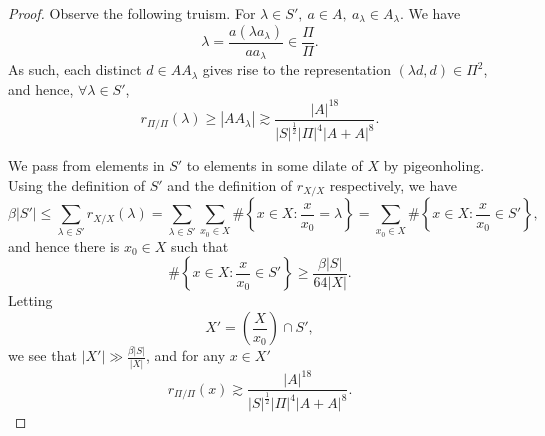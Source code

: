 \documentclass[reqno]{amsart}
\numberwithin{equation}{section}
\begin{document}
\begin{proof}
Observe the following truism. For \(\lambda \in S',~ a \in A,~ a_{\lambda} \in A_{\lambda} \). We have
\[
    \lambda = \frac{a \left( \lambda a_{\lambda}  \right) }{a a_{\lambda} } \in \frac{\Pi}{\Pi} 
.\]
As such, each distinct \(d \in A A_{\lambda} \) gives rise to the representation \((\lambda d, d) \in \Pi ^{2}\), and hence, \(\forall \lambda \in S '\),
\[
    r_{ \Pi / \Pi  } (\lambda) \geq \left\lvert A A_{\lambda}  \right\rvert \gtrsim \frac{\left\lvert A \right\rvert ^{18}}{\left\lvert S \right\rvert ^{\frac{1}{2} } \left\lvert \Pi \right\rvert ^{4} \left\lvert A + A \right\rvert ^{8}} 
.\]

We pass from elements in \(S'\) to elements in some dilate of \(X\) by pigeonholing.
Using the definition of \(S'\) and the definition of \(r_{X / X} \) respectively, we have
\[
    \beta \left\lvert S' \right\rvert \leq  \sum _{\lambda \in S'} r_{ X / X } (\lambda) = \sum _{\lambda \in S'} \sum _{x_0 \in X} \# \left\{ x \in X : \frac{x}{x_0} = \lambda \right\}   = \sum _{x_0 \in X} \# \left\{ x \in X : \frac{x}{x_0} \in S ' \right\}  
,\]
and hence there is \(x_0 \in X\) such that
\[
    \# \left\{ x \in X : \frac{x}{x_0} \in S'  \right\} \geq \frac{\beta \left\lvert S  \right\rvert }{64 \left\lvert X \right\rvert } 
.\]
Letting
\[
    X' = \left( \frac{X}{x_0}  \right) \cap S'
,\]
we see that \(\left\lvert X' \right\rvert \gg \frac{\beta \left\lvert S  \right\rvert }{\left\lvert X \right\rvert } \), and
for any \(x \in X'\)
\begin{equation} \label{eq:xprime-rep}
    r_{ \Pi / \Pi } \left( x  \right)  \gtrsim \frac{\left\lvert A \right\rvert ^{18}}{\left\lvert S \right\rvert ^{\frac{1}{2} } \left\lvert \Pi \right\rvert ^{4} \left\lvert A + A \right\rvert ^{8}}.
\end{equation}  


\end{proof}
\end{document}

